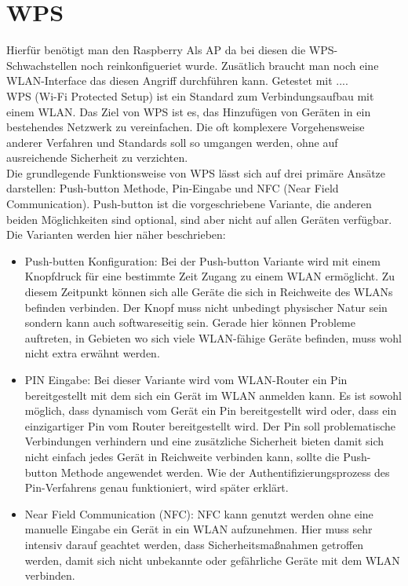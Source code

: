 \section{WPS}
Hierfür benötigt man den Raspberry Als AP da bei diesen die WPS-Schwachstellen noch reinkonfigueriet wurde. Zusätlich braucht man noch eine WLAN-Interface das diesen Angriff durchführen kann. Getestet mit ....\\ %
WPS (Wi-Fi Protected Setup) ist ein Standard zum Verbindungsaufbau mit einem WLAN. Das Ziel von WPS ist es, das Hinzufügen von Geräten in ein bestehendes Netzwerk zu vereinfachen. Die oft komplexere Vorgehensweise anderer Verfahren und Standards soll so umgangen werden, ohne auf ausreichende Sicherheit zu verzichten. \\
Die grundlegende Funktionsweise von WPS lässt sich auf drei primäre Ansätze darstellen: Push-button Methode, Pin-Eingabe und NFC (Near Field Communication). Push-button ist die vorgeschriebene Variante, die anderen beiden Möglichkeiten sind optional, sind aber nicht auf allen Geräten verfügbar. \\
Die Varianten werden hier näher beschrieben:

\begin{itemize}
	\item Push-butten Konfiguration: Bei der Push-button Variante wird mit einem Knopfdruck für eine bestimmte Zeit Zugang zu einem WLAN ermöglicht. Zu diesem Zeitpunkt können sich alle Geräte die sich in Reichweite des WLANs befinden verbinden. Der Knopf muss nicht unbedingt physischer Natur sein sondern kann auch softwareseitig sein. Gerade hier können Probleme auftreten, in Gebieten wo sich viele WLAN-fähige Geräte befinden, muss wohl nicht extra erwähnt werden.

	\item PIN Eingabe: Bei dieser Variante wird vom WLAN-Router ein Pin bereitgestellt mit dem sich ein Gerät im WLAN anmelden kann. Es ist sowohl möglich, dass dynamisch vom Gerät ein Pin bereitgestellt wird oder, dass ein einzigartiger Pin vom Router bereitgestellt wird. Der Pin soll problematische Verbindungen verhindern und eine zusätzliche Sicherheit bieten damit sich nicht einfach jedes Gerät in Reichweite verbinden kann, sollte die Push-button Methode angewendet werden. Wie der Authentifizierungsprozess des Pin-Verfahrens genau funktioniert, wird später erklärt.

	\item Near Field Communication (NFC): NFC kann genutzt werden ohne eine manuelle Eingabe ein Gerät in ein WLAN aufzunehmen. Hier muss sehr intensiv darauf geachtet werden, dass Sicherheitsmaßnahmen getroffen werden, damit sich nicht unbekannte oder gefährliche Geräte mit dem WLAN verbinden.
\end{itemize}

